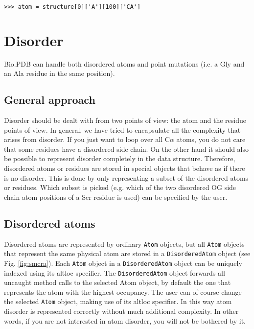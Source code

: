 \documentclass{report}
\begin{document}
\begin{verbatim}
>>> atom = structure[0]['A'][100]['CA']
\end{verbatim}

\section{Disorder}

Bio.PDB can handle both disordered atoms and point mutations (i.e. a
Gly and an Ala residue in the same position). 

\subsection{General approach\label{disorder problems}}

Disorder should be dealt with from two points of view: the atom and the residue
points of view. In general, we have tried to encapsulate all the complexity that
arises from disorder. If you just want to loop over all C$\alpha$ atoms,
you do not care that some residues have a disordered side chain. On the other
hand it should also be possible to represent disorder completely in the data
structure. Therefore, disordered atoms or residues are stored in special objects
that behave as if there is no disorder. This is done by only representing a
subset of the disordered atoms or residues. Which subset is picked (e.g. which
of the two disordered OG side chain atom positions of a Ser residue is used)
can be specified by the user.

\subsection{Disordered atoms\label{disordered atoms}}

Disordered atoms are represented by ordinary \texttt{Atom} objects, but
all \texttt{Atom} objects that represent the same physical atom are stored
in a \texttt{Disordered\-Atom} object (see Fig. \ref{fig:smcra}).
Each \texttt{Atom} object in a \texttt{Disordered\-Atom} object can
be uniquely indexed using its altloc specifier. The \texttt{Disordered\-Atom}
object forwards all uncaught method calls to the selected Atom object,
by default the one that represents the atom with the highest
occupancy. The user can of course change the selected \texttt{Atom}
object, making use of its altloc specifier. In this way atom disorder
is represented correctly without much additional complexity. In other
words, if you are not interested in atom disorder, you will not be
bothered by it.
\end{document}
